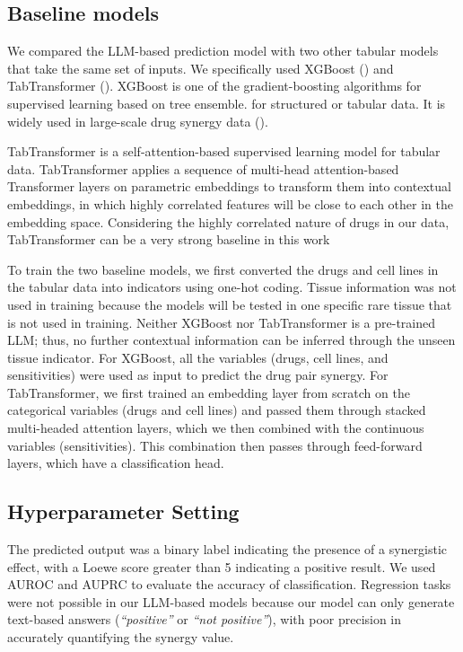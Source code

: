 \subsection{Baseline models}
We compared the LLM-based prediction model with two other tabular models that take the same set of inputs. We specifically used XGBoost (\cite{Chen2016-bv}) and TabTransformer (\cite{huang_tabtransformer_2020}). XGBoost is one of the gradient-boosting algorithms for supervised learning based on tree ensemble. for structured or tabular data. It is  widely used in large-scale drug synergy data (\cite{Sidorov2019-np, Celebi2019-nl}).

TabTransformer is a self-attention-based supervised learning model for tabular data. TabTransformer applies a sequence of multi-head attention-based Transformer layers on parametric embeddings to transform them into contextual embeddings, in which highly correlated features will be close to each other in the embedding space. Considering the highly correlated nature of drugs in our data, TabTransformer can be a very strong baseline in this work

To train the two baseline models, we first converted the drugs and cell lines in the tabular data into indicators using one-hot coding. Tissue information was not used in training because the models will be tested in one specific rare tissue that is not used in training. Neither XGBoost nor TabTransformer is a pre-trained LLM; thus, no further contextual information can be inferred through the unseen tissue indicator. For XGBoost, all the variables (drugs, cell lines, and sensitivities) were used as input to predict the drug pair synergy. For TabTransformer, we first trained an embedding layer from scratch on the categorical variables (drugs and cell lines) and passed them through stacked multi-headed attention layers, which we then combined with the continuous variables (sensitivities). This combination then passes through feed-forward layers, which have a classification head. 

\subsection{Hyperparameter Setting}
\label{sec:hyperparameter}

The predicted output was a binary label indicating the presence of a synergistic effect, with a Loewe score greater than 5 indicating a positive result. We used AUROC and AUPRC to evaluate the accuracy of classification. Regression tasks were not possible in our LLM-based models because our model can only generate text-based answers (\emph{``positive''} or \emph{``not positive''}), with poor precision in accurately quantifying the synergy value. 

